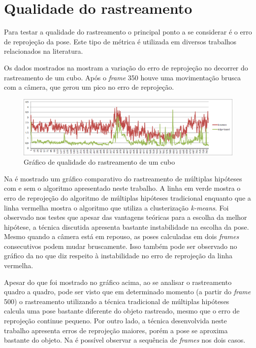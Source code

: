 \section{Qualidade do rastreamento}

Para testar a qualidade do rastreamento o principal ponto a se considerar é o erro de reprojeção da pose. Este tipo de métrica é utilizada em diversos trabalhos relacionados na literatura.

Os dados mostrados na  mostram a variação do erro de reprojeção no decorrer do rastreamento de um cubo. Após o \emph{frame} 350 houve uma movimentação brusca com a câmera, que gerou um pico no erro de reprojeção.

\begin{figure}[!ht]
\centering\includegraphics[width=\textwidth]{monografia/qualidade_cubo_real}
\caption{Gráfico de qualidade do rastreamento de um cubo}
\label{qualidade_cubo_real}
\end{figure}

Na  é mostrado um gráfico comparativo do rastreamento de múltiplas hipóteses com e sem o algoritmo apresentado neste trabalho. A linha em verde mostra o erro de reprojeção do algoritmo de múltiplas hipóteses tradicional enquanto que a linha vermelha mostra o algoritmo que utiliza a clusterização \emph{k-means}. Foi observado nos testes que apesar das vantagens teóricas para a escolha da melhor hipótese, a técnica discutida apresenta bastante instabilidade na escolha da pose. Mesmo quando a câmera está em repouso, as poses calculadas em dois \emph{frames} consecutivos podem mudar bruscamente. Isso também pode ser observado no gráfico da  no que diz respeito à instabilidade no erro de reprojeção da linha vermelha.

Apesar do que foi mostrado no gráfico acima, ao se analisar o rastreamento quadro a quadro, pode ser visto que em determinado momento (a partir do \emph{frame} 500) o rastreamento utilizando a técnica tradicional de múltiplas hipóteses calcula uma pose bastante diferente do objeto rastreado, mesmo que o erro de reprojeção continue pequeno. Por outro lado, a técnica desenvolvida neste trabalho apresenta erros de reprojeção maiores, porém a pose se aproxima bastante do objeto. Na  é possível observar a sequência de \emph{frames} nos dois casos.

